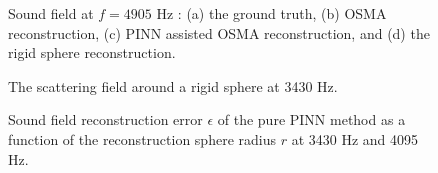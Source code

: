 \documentclass[11pt]{article}
\begin{document}
\begin{figure}[t]
	\centerline{}
	\caption{Sound field at $f=4905$ Hz : (a) the ground truth, 
		(b) OSMA reconstruction, (c) PINN assisted OSMA reconstruction, and (d) the rigid sphere reconstruction.}
\label{fig:4095}
\end{figure}










\begin{figure}[t]
\centerline{}
\caption{The scattering field around a rigid sphere at 3430 Hz.}
\label{fig:scatter}
\end{figure}



\begin{figure}[t]
\centerline{}
\caption{Sound field reconstruction error $\epsilon$ of the pure PINN method as a 
function of the reconstruction sphere radius $r$ at 3430 Hz and 4095 Hz.}
\label{fig:freq}
\end{figure}
\end{document}
